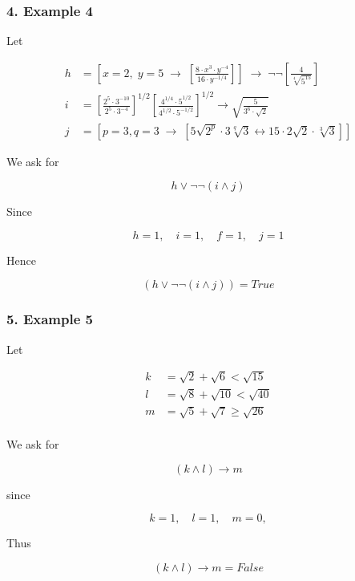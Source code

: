 \subsubsection{4. Example 4}\label{example-4}

Let

\[
\begin{align*}
h &= \displaystyle\left[ x=2, \; y=5 \;\to\; \left[\frac{8 \cdot x^3 \cdot y^{-4}}{16 \cdot y^{-1/4}}\right]\right] 
      \;\to\; \neg \neg \left[\frac{4}{\sqrt[4]{5^{15}}}\right] \\[2mm]
i &= \displaystyle\left[\frac{2^5 \cdot 3^{-10}}{2^5 \cdot 3^{-4}}\right]^{1/2}
      \left[\frac{4^{1/4} \cdot 5^{1/2}} {4^{1/2} \cdot 5^{-1/2}}\right]^{1/2} \to \sqrt{\frac{5}{3^6 \cdot \sqrt{2}}}\\
j &= \displaystyle\left[p = 3, q = 3 \;\to\; \left[ 5 \sqrt{2^p} \cdot 3 \sqrt[q]{3} 
      \leftrightarrow 15 \cdot 2 \sqrt{2} \cdot \sqrt[3]{3} \right]\right]
\end{align*}
\]

We ask for

\[h \lor \neg \neg (i \land j)\]

Since

\[
h = 1, \quad i = 1, \quad f = 1 , \quad j = 1
\]

Hence

\[
\boxed{(h \lor \neg \neg (i \land j)) = True}
\]

\subsubsection{5. Example 5}\label{example-5}

Let

\[ \begin{align*}
k &= \sqrt{2} + \sqrt{6} < \sqrt{15}\\
l &= \sqrt{8} + \sqrt{10} < \sqrt{40}\\
m &= \sqrt{5} + \sqrt{7} \ge \sqrt{26}\\
\end{align*}
\]

We ask for

\[(k \land l) \to m\]

since

\[
k = 1, \quad l = 1, \quad m = 0 ,
\]

Thus

\[
\boxed{(k \land l) \to m = False}
\]
